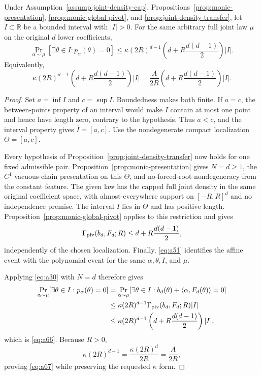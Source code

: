 \begin{proposition}
\label{prop:monic-positive-interval}
Under Assumption~\ref{assump:joint-density-cap},
Propositions~\ref{prop:monic-presentation}, \ref{prop:monic-global-pivot},
and \ref{prop:joint-density-transfer}, let $I\subset\mathbb R$ be a bounded
interval with $|I|>0$.  For the same arbitrary full joint law $\mu$ on the
original $d$ lower coefficients,
\[
\Pr_{\alpha\sim\mu}\!\left[\exists\theta\in I:p_\alpha(\theta)=0\right]
\leq\kappa(2R)^{d-1}
\left(d+R\frac{d(d-1)}2\right)|I|.
\tag{A66}\label{eq:a66}
\]
Equivalently,
\[
\kappa(2R)^{d-1}
\left(d+R\frac{d(d-1)}2\right)|I|
=\frac A{2R}
\left(d+R\frac{d(d-1)}2\right)|I|.
\tag{A67}\label{eq:a67}
\]
\end{proposition}

\begin{proof}
Set $a=\inf I$ and $c=\sup I$.  Boundedness makes both finite.  If $a=c$,
the between-points property of an interval would make $I$ contain at most
one point and hence have length zero, contrary to the hypothesis.  Thus
$a<c$, and the interval property gives $\overline I=[a,c]$.  Use the
nondegenerate compact localization $\Theta=[a,c]$.

Every hypothesis of Proposition~\ref{prop:joint-density-transfer} now holds
for one fixed admissible pair.  Proposition~\ref{prop:monic-presentation}
gives $N=d\geq1$, the $C^1$ vacuous-chain presentation on this $\Theta$,
and no-forced-root nondegeneracy from the constant feature.  The given law
has the capped full joint density in the same original coefficient space,
with almost-everywhere support on $[-R,R]^d$ and no independence premise.
The interval $I$ lies in $\Theta$ and has positive length.
Proposition~\ref{prop:monic-global-pivot} applies to this restriction and
gives
\[
\Gamma_{\rm piv}(b_d,F_d;R)
\leq d+R\frac{d(d-1)}2,
\]
independently of the chosen localization.  Finally, \eqref{eq:a51}
identifies the affine event with the polynomial event for the same
$\alpha,\theta,I$, and $\mu$.

Applying \eqref{eq:a30} with $N=d$ therefore gives
\[
\begin{aligned}
\Pr_{\alpha\sim\mu}[\exists\theta\in I:p_\alpha(\theta)=0]
&=\Pr_{\alpha\sim\mu}[\exists\theta\in I:
 b_d(\theta)+\langle\alpha,F_d(\theta)\rangle=0]\\
&\leq\kappa(2R)^{d-1}
 \Gamma_{\rm piv}(b_d,F_d;R)|I|\\
&\leq\kappa(2R)^{d-1}
 \left(d+R\frac{d(d-1)}2\right)|I|,
\end{aligned}
\]
which is \eqref{eq:a66}.  Because $R>0$,
\[
\kappa(2R)^{d-1}
=\frac{\kappa(2R)^d}{2R}=\frac A{2R},
\]
proving \eqref{eq:a67} while preserving the requested $\kappa$ form.


\end{proof}
